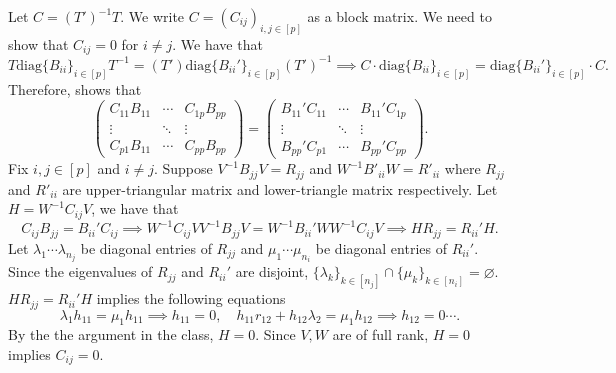 \documentclass[11pt]{article}
\theoremstyle{plain}
\theoremstyle{definition}
\theoremstyle{remark}
\newcommand{\diag}{\mathrm{diag}}
\newcommand{\C}{\mathbb{C}}
\renewcommand{\emptyset}{\varnothing}
\begin{document}
Let $C = (T')^{-1}T$. 
We write $C = (C_{ij})_{i,j\in[p]}$ as a block matrix.
We need to show that $C_{ij} = 0$ for $i\neq j$.
We have that
\begin{equation}\label{eq:P7_1}
    T \diag\{B_{ii}\}_{i\in [p]}T^{-1} = (T') \diag\{B_{ii}'\}_{i\in [p]}(T')^{-1} \implies C\cdot \diag\{B_{ii}\}_{i\in [p]} = \diag\{B_{ii}'\}_{i\in [p]}\cdot C .
\end{equation}
Therefore,  shows that
$$
    \begin{pmatrix}
        C_{11}B_{11}   &\cdots  &C_{1p}B_{pp}
        \\\vdots &\ddots  &\vdots
        \\C_{p1}B_{11} &\cdots  &C_{pp}B_{pp}
    \end{pmatrix}
    = \begin{pmatrix}
        B_{11}'C_{11}  &\cdots  &B_{11}'C_{1p}
        \\\vdots &\ddots  &\vdots
        \\B_{pp}'C_{p1} &\cdots  &B_{pp}'C_{pp}
    \end{pmatrix} .
$$
Fix $i,j\in[p]$ and $i\neq j$. 
Suppose $V^{-1} B_{jj} V =  R_{jj}$ and $W^{-1} B'_{ii} W = R'_{ii}$ where $R_{jj}$ and $R'_{ii}$ are upper-triangular matrix and lower-triangle matrix respectively.
Let $H = W^{-1}C_{ij} V$, we have that 
$$
    C_{ij} B_{jj} = B_{ii}'C_{ij} \implies W^{-1}C_{ij}VV^{-1}B_{jj}V = W^{-1}B_{ii}'WW^{-1}C_{ij}V \implies HR_{jj} = R_{ii}'H.
$$
Let $\lambda_1 \cdots \lambda_{n_j}$ be diagonal entries of $R_{jj}$ and $\mu_1 \cdots \mu_{n_i}$ be diagonal entries of $R_{ii}'$.
Since the eigenvalues of $R_{jj}$ and $R_{ii}'$ are disjoint, $\{\lambda_k\}_{k\in[n_j]} \cap \{\mu_k\}_{k\in[n_i]} = \emptyset$. 
$HR_{jj} = R_{ii}' H$ implies the following equations
$$
    \lambda_1 h_{11} = \mu_1 h_{11}\implies h_{11}=0,\quad h_{11}r_{12}+h_{12}\lambda_2 = \mu_1h_{12}\implies h_{12}=0\cdots .
$$
By the the argument in the class, $H = 0$.
Since $V,W$ are of full rank, $H = 0$ implies $C_{ij} = 0$.
\end{document}
